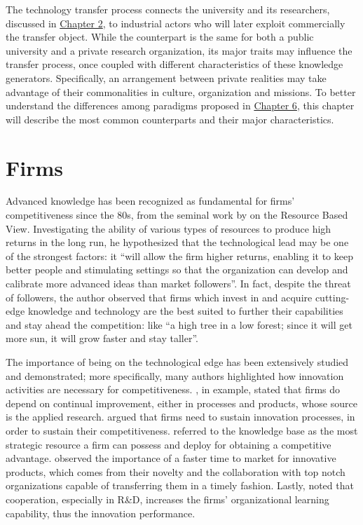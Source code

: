 

\label{Chapter3} %

The technology transfer process connects the university and its researchers, discussed in \hyperref[Chapter2]{Chapter 2}, to industrial actors who will later exploit commercially the transfer object. While the counterpart is the same for both a public university and a private research organization, its major traits may influence the transfer process, once coupled with different characteristics of these knowledge generators. Specifically, an arrangement between private realities may take advantage of their commonalities in culture, organization and missions. To better understand the differences among paradigms proposed in \hyperref[Chapter6]{Chapter 6}, this chapter will describe the most common counterparts and their major characteristics.

\section{Firms}

Advanced knowledge has been recognized as fundamental for firms' competitiveness since the 80s, from the seminal work by \citet{Wernerfelt1984} on the Resource Based View. Investigating the ability of various types of resources to produce high returns in the long run, he hypothesized that the technological lead may be one of the strongest factors: it \enquote{will allow the firm higher returns, enabling it to keep better people and stimulating settings so that the organization can develop and calibrate more advanced ideas than market followers}. In fact, despite the threat of followers, the author observed that firms which invest in and acquire cutting-edge knowledge and technology are the best suited to further their capabilities and stay ahead the competition: like \enquote{a high tree in a low forest; since it will get more sun, it will grow faster and stay taller}.

The importance of being on the technological edge has been extensively studied and demonstrated; more specifically, many authors highlighted how innovation activities are necessary for competitiveness. \citet{Beath2000}, in example, stated that firms do depend on continual improvement, either in processes and products, whose source is the applied research. \citet{Yusuf2008} argued that firms need to sustain innovation processes, in order to sustain their competitiveness. \citet{Jimenez2011} referred to the knowledge base as the most strategic resource a firm can possess and deploy for obtaining a competitive advantage. \citet{Siegel2003a} observed the importance of a faster time to market for innovative products, which comes from their novelty and the collaboration with top notch organizations capable of transferring them in a timely fashion. Lastly, \citet{AzagraCaro2010} noted that cooperation, especially in R\&D, increases the firms' organizational learning capability, thus the innovation performance. 

